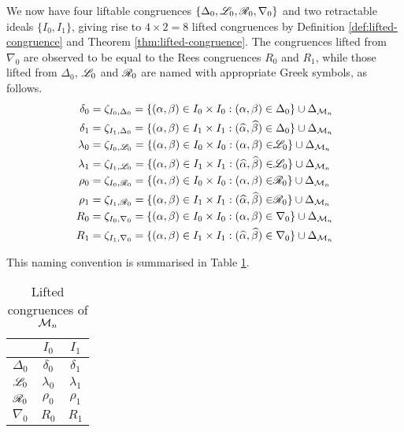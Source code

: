 We now have four liftable congruences $\{\Delta_0, \mathrel{\mathscr{L}}_0, \mathrel{\mathscr{R}}_0, \nabla_0\}$ and
two retractable ideals $\{I_0, I_1\}$, giving rise to $4 \times 2 = 8$ lifted
congruences by Definition \ref{def:lifted-congruence} and Theorem
\ref{thm:lifted-congruence}.  The congruences lifted from $\nabla_0$ are
observed to be equal to the Rees congruences $R_0$ and $R_1$, while those lifted
from $\Delta_0$, $\mathrel{\mathscr{L}}_0$ and $\mathrel{\mathscr{R}}_0$ are named with appropriate Greek symbols,
as follows.
\begin{align*}
  \delta_0 &= \zeta_{I_0,\Delta_0}
  = \{(\alpha,\beta) \in I_0 \times I_0 :
    (\alpha, \beta) \in \Delta_0\} \cup \Delta_{\mathcal{M}_n} \\
  \delta_1 &= \zeta_{I_1,\Delta_0}
  = \{(\alpha,\beta) \in I_1 \times I_1 :
    (\widehat\alpha, \widehat\beta) \in \Delta_0\} \cup \Delta_{\mathcal{M}_n} \\
  \lambda_0 &=\zeta_{I_0,\mathrel{\mathscr{L}}_0}
  = \{(\alpha,\beta) \in I_0 \times I_0 :
    (\alpha, \beta) \in \mathrel{\mathscr{L}}_0\} \cup \Delta_{\mathcal{M}_n} \\
  \lambda_1 &= \zeta_{I_1,\mathrel{\mathscr{L}}_0}
  = \{(\alpha,\beta) \in I_1 \times I_1 :
    (\widehat\alpha, \widehat\beta) \in \mathrel{\mathscr{L}}_0\} \cup \Delta_{\mathcal{M}_n} \\
  \rho_0 &= \zeta_{I_0,\mathrel{\mathscr{R}}_0}
  = \{(\alpha,\beta) \in I_0 \times I_0 :
    (\alpha, \beta) \in \mathrel{\mathscr{R}}_0\} \cup \Delta_{\mathcal{M}_n} \\
  \rho_1 &= \zeta_{I_1,\mathrel{\mathscr{R}}_0}
  = \{(\alpha,\beta) \in I_1 \times I_1 :
    (\widehat\alpha, \widehat\beta) \in \mathrel{\mathscr{R}}_0\} \cup \Delta_{\mathcal{M}_n} \\
  R_0 &= \zeta_{I_0,\nabla_0}
  = \{(\alpha,\beta) \in I_0 \times I_0 :
    (\alpha, \beta) \in \nabla_0\} \cup \Delta_{\mathcal{M}_n} \\
  R_1 &= \zeta_{I_1,\nabla_0}
  = \{(\alpha,\beta) \in I_1 \times I_1 :
    (\widehat\alpha, \widehat\beta) \in \nabla_0\} \cup \Delta_{\mathcal{M}_n}
\end{align*}

This naming convention is summarised in Table \ref{tab:mn-lifted-congruences}.

\begin{table}[h]
  \centering
  \renewcommand\arraystretch{1.0}
  \begin{tabular}[h]{| c | c | c |}
    \cline{2-3}
    \mc1{c|}{} & $I_0$ & $I_1$ \\ \hline
    $\Delta_0$ & $\delta_0$ & $\delta_1$ \\ \hline
    $\mathrel{\mathscr{L}}_0$ & $\lambda_0$ & $\lambda_1$ \\ \hline
    $\mathrel{\mathscr{R}}_0$ & $\rho_0$ & $\rho_1$ \\ \hline
    $\nabla_0$ & $R_0$ & $R_1$ \\ \hline
  \end{tabular}
  \caption{Lifted congruences of $\mathcal{M}_n$}
  \label{tab:mn-lifted-congruences}
\end{table}

